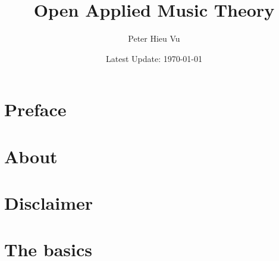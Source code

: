 \documentclass[12pt]{book}
\title{Open Applied Music Theory}
\author{Peter Hieu Vu}
\date{Latest Update: \today}
\newcommand\onlyinsubfile[1]{#1}
\newcommand\notinsubfile[1]{}
\begin{document}
    \renewcommand{\onlyinsubfile}[1]{}
    \renewcommand{\notinsubfile}[1]{#1}

    \maketitle

    \frontmatter
    \chapter{Preface}
        

    \chapter{About}
        

    \tableofcontents

    \chapter{Disclaimer}
        

    \mainmatter 
    \setcounter{chapter}{-1}
    
    \chapter{The basics}\label{ch.0}
        
    
\end{document}
